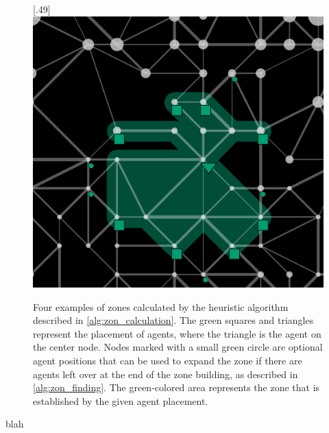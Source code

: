 \begin{figure}
  [.49\linewidth]{\includegraphics[width=.49\linewidth]{images/zone4.png}}
  \caption{Four examples of zones calculated by the heuristic algorithm described in \autoref{alg:zon_calculation}. The green squares and triangles represent the placement of agents, where the triangle is the agent on the center node. Nodes marked with a small green circle are optional agent positions that can be used to expand the zone if there are agents left over at the end of the zone building, as described in \autoref{alg:zon_finding}. The green-colored area represents the zone that is established by the given agent placement.}
  \label{fig:zones}
\end{figure}
blah

